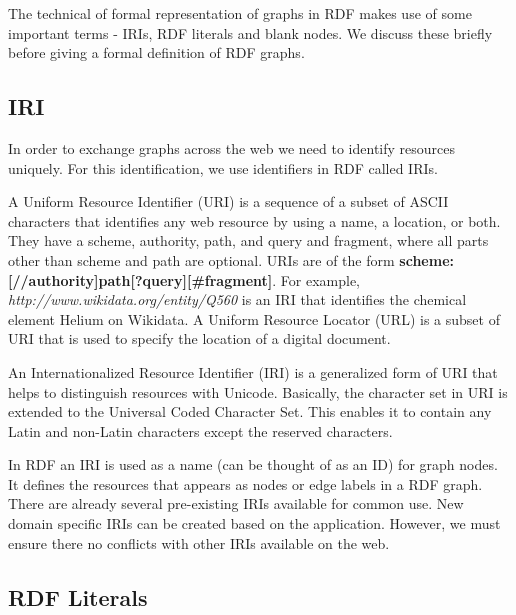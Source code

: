 The technical of formal representation of graphs in RDF makes use of some important terms - IRIs, RDF literals and blank nodes. We discuss these briefly before giving a formal definition of RDF graphs.




\subsection*{IRI}

In order to exchange graphs across the web we need to identify resources uniquely. For this identification, we use identifiers in RDF called IRIs. 

A Uniform Resource Identifier (\acrshort{URI}) is a sequence of a subset of ASCII characters that identifies any web resource by using a name, a location, or both. They have a scheme, authority, path, and query and fragment, where all parts other than scheme and path are optional. URIs are of the form \textbf{scheme:[//authority]path[?query][\#fragment]}. For example, \textit{http://www.wikidata.org/entity/Q560} is an IRI that identifies the chemical element Helium on Wikidata. A Uniform Resource Locator (\acrshort{URL}) is a subset of URI that is used to specify the location of a digital document.

An Internationalized Resource Identifier (\acrshort{IRI}) is a generalized form of URI that helps to distinguish resources with Unicode. Basically, the character set in URI is extended to the Universal Coded Character Set. This enables it to contain any Latin and non-Latin characters except the reserved characters.

In RDF an IRI is used as a name (can be thought of as an ID) for graph nodes. It defines the resources that appears as nodes or edge labels in a RDF graph. There are already several pre-existing IRIs available for common use. New domain specific IRIs can be created based on the application. However, we must ensure there no conflicts with other IRIs available on the web.

\subsection*{RDF Literals}

